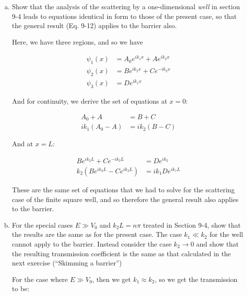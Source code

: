 \documentclass[10pt]{article}
\begin{document}
    \begin{enumerate}[(a)]
        \item Show that the analysis of the scattering by a one-dimensional \textit{well} in section 9-4 leads to equations identical in form to those of the present case, so that the general result (Eq. 9-12) applies to the barrier also. 
        
        \begin{solution}
            Here, we have three regions, and so we have

            \begin{align*}
                \psi_1(x) &= A_0 e^{ik_1x} + Ae^{ik_2x}\\
                \psi_2(x) &= Be^{ik_2x} + Ce^{-ik_2x}\\
                \psi_3(x) &= De^{ik_1x}
            \end{align*}

            And for continuity, we derive the set of equations at $x = 0$: 

            \begin{align*}
                A_0 + A &= B + C\\
                ik_1(A_0 - A) &= ik_2(B - C)
            \end{align*}

            And at $x = L$: 

            \begin{align*}
                Be^{ik_2L} + Ce^{-ik_2L} &= De^{ik_2}\\
                k_2(Be^{ik_2L} - Ce^{ik_2L}) &= ik_1De^{ik_1L}
            \end{align*}

            These are the same set of equations that we had to solve for the scattering case of the finite square well, and so therefore the general result also applies to the barrier.
        \end{solution}
        \item For the special cases $E \gg V_0$ and $k_2L = n\pi$ treated in Section 9-4, show that the results are the same as for the present case. The case $k_1 \ll k_2$ for the well cannot apply to the barrier. Instead consider the case $k_2 \to 0$ and show that the resulting transmission coefficient is the same as that calculated in the next exercise (``Skimming a barrier'')
        
        \begin{solution}
            For the case where $E \gg V_0$, then we get $k_1 \approx k_2$, so we get the transmission to be: 


\end{solution}
\end{enumerate}
\end{document}
